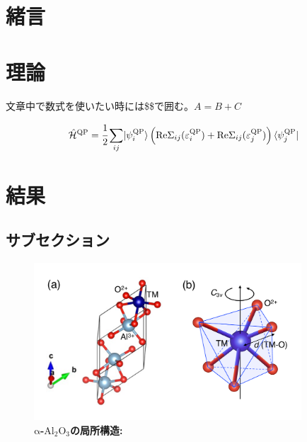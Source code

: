 \documentclass[a4paper,12pt,oneside,openany,uplatex,dvipdfmx]{jsarticle}
\begin{document}
 
\tableofcontents %
\newpage
\clearpage


\section{緒言}\label{sec:introduction}


\newpage
\section{理論}\label{sec:theory}

文章中で数式を使いたい時には\$\$で囲む。$A=B+C$

\begin{align}
	{\hat{\mathcal{H}}}^{\mathrm{QP}} = \cfrac{1}{2} \sum_{ij} \lvert \psi_i^{\mathrm{QP}} \rangle \left( \mathrm{Re} \Sigma_{ij} (\varepsilon_{i}^{\mathrm{QP}}) + \mathrm{Re} \Sigma_{ij}(\varepsilon_j^{\mathrm{QP}}) \right) \langle \psi_j^{\mathrm{QP}} \rvert
\end{align}

\newpage
\section{結果}\label{sec:results}

\subsection{サブセクション}\label{subsec:label}
\begin{figure}[H] 
   \centering
   \includegraphics[clip, width=10cm]{img/ruby_local_struc.pdf} 
   \caption{\textbf{$\mathrm{\alpha}$-$\mathrm{Al_2O_3}$の局所構造:} }
   \label{fig:ruby_loca_struc}
\end{figure}
\end{document}
